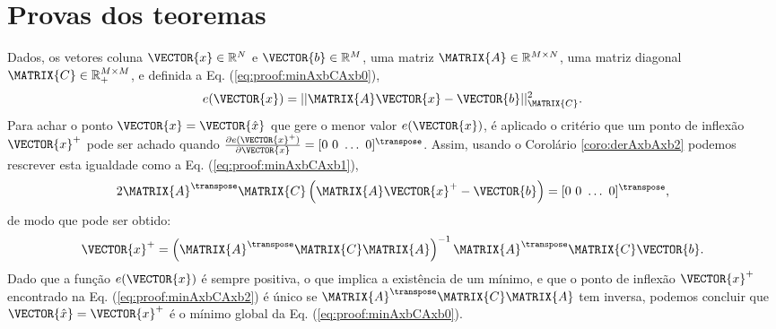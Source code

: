 \section{Provas dos teoremas}
 
\begin{myproofT}\label{proof:theo:minAxbCAxb}
Dados,
os vetores coluna $\VECTOR{x}\in \mathbb{R}^N$ e $\VECTOR{b}\in \mathbb{R}^M$,  
uma matriz $\MATRIX{A} \in \mathbb{R}^{M\times N}$, 
uma matriz diagonal $\MATRIX{C} \in \mathbb{R}^{M\times M}_+$, e 
definida a Eq. (\ref{eq:proof:minAxbCAxb0}),
\begin{equation}\label{eq:proof:minAxbCAxb0}
e(\VECTOR{x})=||\MATRIX{A}\VECTOR{x}-\VECTOR{b}||_{\MATRIX{C}}^2.
\end{equation}
Para achar o ponto $\VECTOR{x}=\VECTOR{\hat{x}}$ que gere o menor valor $e(\VECTOR{x})$, é aplicado
o critério que um ponto de inflexão $\VECTOR{x}^+$ pode ser achado quando 
$\frac{\partial e(\VECTOR{x}^+)}{\partial \VECTOR{x} }=[0~ 0~ \hdots~ 0 ]^{\transpose}$.
Assim, usando o Corolário \ref{coro:derAxbAxb2} podemos 
rescrever esta igualdade como a Eq. (\ref{eq:proof:minAxbCAxb1}),
\begin{equation}\label{eq:proof:minAxbCAxb1}
2 \MATRIX{A}^{\transpose}\MATRIX{C}\left(\MATRIX{A}\VECTOR{x}^+-\VECTOR{b}\right)=[0~ 0~ \hdots~ 0 ]^{\transpose},
\end{equation}
de modo que pode ser obtido:
\begin{equation}\label{eq:proof:minAxbCAxb2}
\VECTOR{x}^+=\left( \MATRIX{A}^{\transpose}\MATRIX{C}\MATRIX{A} \right)^{-1} \MATRIX{A}^{\transpose}\MATRIX{C} \VECTOR{b}.
\end{equation}
Dado que  a função $e(\VECTOR{x})$ é sempre positiva, o que implica a existência de um mínimo,
e que o ponto de inflexão $\VECTOR{x}^+$ encontrado na Eq. (\ref{eq:proof:minAxbCAxb2}) 
é único se $\MATRIX{A}^{\transpose}\MATRIX{C}\MATRIX{A}$ tem inversa, 
podemos concluir que  $\VECTOR{\hat{x}}=\VECTOR{x}^+$ é o mínimo global da Eq. (\ref{eq:proof:minAxbCAxb0}).
\end{myproofT}

